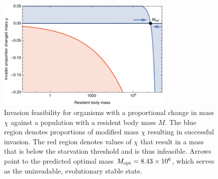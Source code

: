 \documentclass{pnastwo}
\begin{document}
\begin{figure}
\centering
\includegraphics[width=0.75\textwidth]{fig_Invasion.pdf}
\caption{ Invasion feasibility for organisms with a proportional change in
  mass $\chi$ against a population with a resident body mass $M$.  The blue
  region denotes proportions of modified mass $\chi$ resulting in successful invasion.  The
  red region denotes values of $\chi$ that result in a mass that is below the
  starvation threshold and is thus infeasible.
  Arrows point to the predicted optimal mass $M_{\rm opt}=8.43\times 10^6$, which serves as the uninvadable, evolutionary stable state.}
\label{fig:invasion}
\end{figure}


%
%
%
%
%
%
%
%
%
%
%
\end{document}
